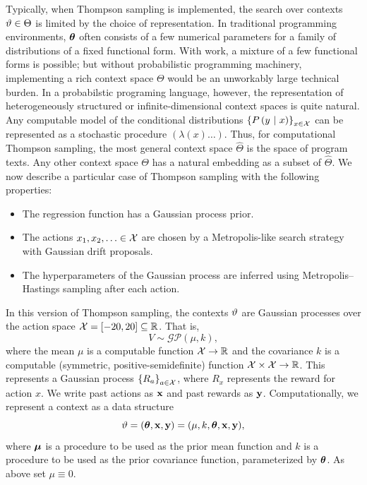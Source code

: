 Typically, when Thompson sampling is implemented, the search over contexts
$\vartheta \in \Theta$ is limited by the choice of representation.  In
traditional programming environments, $\bm{\theta}$ often consists of a few
numerical parameters for a family of distributions of a fixed functional
form.  With work, a mixture of a few functional forms is possible; but
without probabilistic programming machinery, implementing a rich context
space $\Theta$ would be an unworkably large technical burden.  In a
probabilstic programing language, however, the representation of
heterogeneously structured or infinite-dimensional context spaces is quite
natural.  Any computable model of the conditional distributions
$\left\{ P\left( y \ \middle\vert\  x \right) \right\}_{x \in \mathcal{X}}$ can be represented as a stochastic
procedure $(\lambda (x) \ldots)$.  Thus, for computational Thompson sampling,
the most general context space $\widehat\Theta$ is the space of program texts.
Any other context space $\Theta$ has a natural embedding as a subset of
$\widehat\Theta$.
\label{sec:math-spec}
We now describe a particular case of Thompson sampling with the following properties:
\begin{itemize}
  \item The regression function has a Gaussian process prior.
  \item The actions $x_1,x_2,\ldots \in \mathcal{X}$ are chosen by a Metropolis-like search
    strategy with Gaussian drift proposals.
  \item The hyperparameters of the Gaussian process are inferred using
    Metropolis--Hastings sampling after each action.
\end{itemize}

In this version of Thompson sampling, the contexts $\vartheta$ are Gaussian
processes over the action space $\mathcal{X} = [-20, 20] \subseteq \mathbb{R}$.  That is,
\[ V \sim \mathcal{GP}(\mu,k), \]
where the mean $\mu$ is a computable function $\mathcal{X} \to \mathbb{R}$ and the covariance
$k$ is a computable (symmetric, positive-semidefinite) function $\mathcal{X} \times
\mathcal{X} \to \mathbb{R}$.  This represents a Gaussian process $\left\{ R_a \right\}_{a \in \mathcal{X}}$,
where $R_x$ represents the reward for action $x$. We write past actions as
$\mathbf{x}$ and past rewards as $\mathbf{y}$. Computationally, we represent
a context as a data structure
\[ \vartheta = (\bm{\theta}, \mathbf{x}, \mathbf{y}) = (\mu, k,\bm{\theta}, \mathbf{x}, \mathbf{y}), \]
where $\bm{\mu}$ is a procedure to be used as the prior mean function and
$k$ is a procedure to be used as the prior covariance function, parameterized by 
$\bm{\theta}$.
As above set $\mu \equiv 0$.

